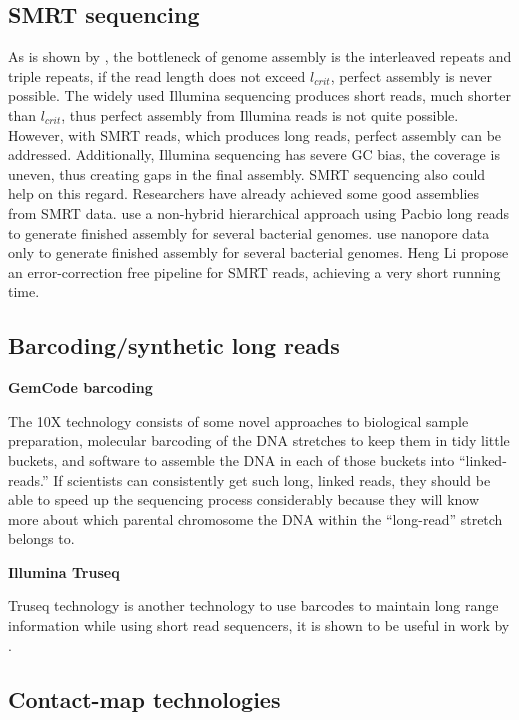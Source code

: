 \documentclass{bioinfo}
\begin{document}
\subsection{SMRT sequencing}
As is shown by \cite{bresler2013optimal}, the bottleneck of genome assembly is the interleaved repeats and triple repeats, if the read length does not exceed $l_{crit}$, perfect assembly is never possible. The widely used Illumina sequencing produces short reads, much shorter than $l_{crit}$, thus perfect assembly from Illumina reads is not quite possible. However, with SMRT reads, which produces long reads, perfect assembly can be addressed. Additionally, Illumina sequencing has severe GC bias, the coverage is uneven, thus creating gaps in the final assembly. SMRT sequencing also could help on this regard. Researchers have already achieved some good assemblies from SMRT data. \cite{chin2013nonhybrid} use a non-hybrid hierarchical approach using Pacbio long reads to generate finished assembly for several bacterial genomes. \cite{loman2015} use nanopore data only to generate finished assembly for several bacterial genomes. Heng Li propose an error-correction free pipeline for SMRT reads, achieving a very short running time. 

\subsection{Barcoding/synthetic long reads}

{\bf GemCode barcoding}

The 10X technology consists of some novel approaches to biological sample preparation, molecular barcoding of the DNA stretches to keep them in tidy little buckets, and software to assemble the DNA in each of those buckets into “linked-reads.” If scientists can consistently get such long, linked reads, they should be able to speed up the sequencing process considerably because they will know more about which parental chromosome the DNA within the “long-read” stretch belongs to.

{\bf Illumina Truseq}

Truseq technology is another technology to use barcodes to maintain long range information while using short read sequencers, it is shown to be useful in work by \cite{McCoy2014}.

\subsection{Contact-map technologies}
\end{document}
